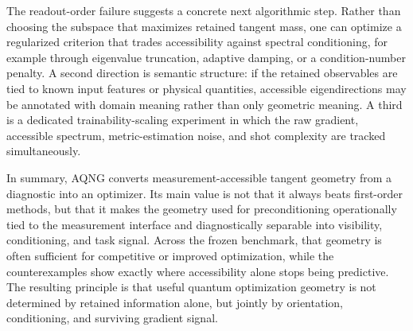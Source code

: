 The readout-order failure suggests a concrete next algorithmic step. Rather than choosing the subspace that maximizes retained tangent mass, one can optimize a regularized criterion that trades accessibility against spectral conditioning, for example through eigenvalue truncation, adaptive damping, or a condition-number penalty. A second direction is semantic structure: if the retained observables are tied to known input features or physical quantities, accessible eigendirections may be annotated with domain meaning rather than only geometric meaning. A third is a dedicated trainability-scaling experiment in which the raw gradient, accessible spectrum, metric-estimation noise, and shot complexity are tracked simultaneously.

In summary, AQNG converts measurement-accessible tangent geometry from a diagnostic into an optimizer. Its main value is not that it always beats first-order methods, but that it makes the geometry used for preconditioning operationally tied to the measurement interface and diagnostically separable into visibility, conditioning, and task signal. Across the frozen benchmark, that geometry is often sufficient for competitive or improved optimization, while the counterexamples show exactly where accessibility alone stops being predictive. The resulting principle is that useful quantum optimization geometry is not determined by retained information alone, but jointly by orientation, conditioning, and surviving gradient signal.
